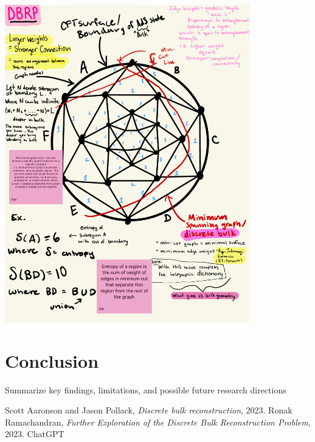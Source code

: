 \documentclass[12pt]{article}
\begin{document}
\begin{center}
    \includegraphics[width=0.8\textwidth]{dbrp_summed.pdf}
\end{center}

\section{Conclusion}
Summarize key findings, limitations, and possible future research directions

\newpage

\begin{thebibliography}{9}
    Scott Aaronson and Jason Pollack, \textit{Discrete bulk reconstruction}, 2023.
    Ronak Ramachandran, \textit{Further Exploration of the Discrete Bulk Reconstruction Problem}, 2023.
    ChatGPT
\end{thebibliography}
\end{document}
